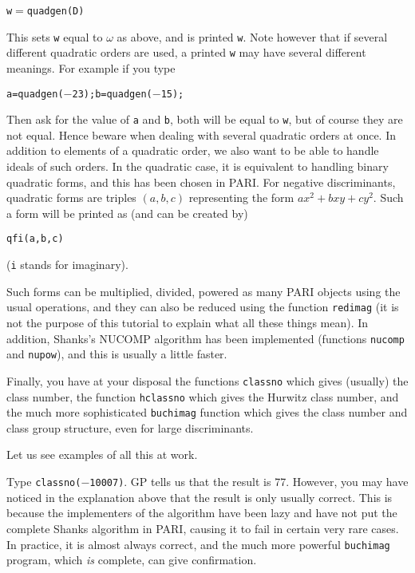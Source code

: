 \centerline{\tt w$=$quadgen(D)}

This sets {\tt w} equal to $\omega$ as above, and is printed {\tt w}. Note
however that if several different quadratic orders are used, a printed {\tt w}
may have several different meanings. For example if you type

\centerline{\tt a=quadgen($-$23);b=quadgen($-$15);}

Then ask for the value of {\tt a} and {\tt b}, both will be equal to {\tt w},
but of course they are not equal. Hence beware when dealing with several 
quadratic orders at once. 
\smallskip
In addition to elements of a quadratic order, we also want to be able to handle
ideals of such orders. In the quadratic case, it is equivalent to handling
binary quadratic forms, and this has been chosen in PARI. For negative
discriminants, quadratic forms are triples $(a,b,c)$ representing the form
$ax^2+bxy+cy^2$. Such a form will be printed as (and can be created by)

\centerline{\tt qfi(a,b,c)}

({\tt i} stands for imaginary).

Such forms can be multiplied, divided, powered as many PARI objects using
the usual operations, and they can also be reduced using the function
{\tt redimag} (it is not the purpose of this tutorial to explain what all these
things mean). In addition, Shanks's NUCOMP algorithm has been implemented
(functions {\tt nucomp} and {\tt nupow}), and this is usually a little faster.

Finally, you have at your disposal the functions {\tt classno} which gives 
(usually) the class number, the function {\tt hclassno} which gives the
Hurwitz class number, and the much more sophisticated {\tt buchimag} function
which gives the class number and class group structure, even for large 
discriminants.

Let us see examples of all this at work.

Type {\tt classno($-$10007)}. GP tells us that the result is 77. However, you may
have noticed in the explanation above that the result is only usually correct.
This is because the implementers of the algorithm have been lazy and have not
put the complete Shanks algorithm in PARI, causing it to fail in certain very
rare cases. In practice, it is almost always correct, and the much more 
powerful {\tt buchimag} program, which {\it is} complete, can give
confirmation.

